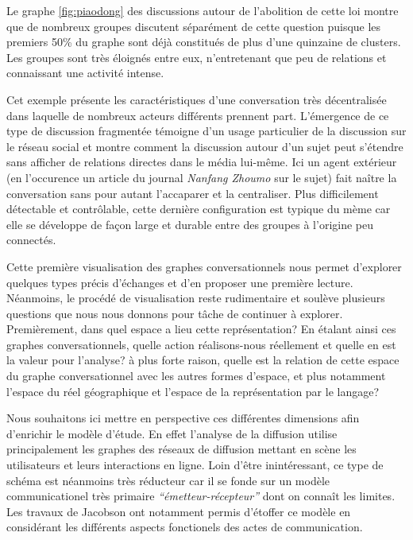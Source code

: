 Le graphe \ref{fig:piaodong} des discussions autour de l{\textquoteright}abolition de cette loi montre que de nombreux groupes discutent séparément de cette question puisque les premiers 50\% du graphe sont déjà constitués de plus d{\textquoteright}une quinzaine de clusters. Les groupes sont très éloignés entre eux, n{\textquoteright}entretenant que peu de relations et connaissant une activité intense.


Cet exemple présente les caractéristiques d{\textquoteright}une conversation très décentralisée dans laquelle de nombreux acteurs différents prennent part. L{\textquoteright}émergence de ce type de discussion fragmentée témoigne d{\textquoteright}un usage particulier de la discussion sur le réseau social et montre comment la discussion autour d{\textquoteright}un sujet peut s{\textquoteright}étendre sans afficher de relations directes dans le média lui-m\^eme. Ici un agent extérieur (en l{\textquoteright}occurence un article du journal \textit{Nanfang Zhoumo }sur le sujet) fait na\^itre la conversation sans pour autant l{\textquoteright}accaparer et la centraliser. Plus difficilement détectable et contr\^olable, cette dernière configuration est typique du mème car elle se développe de fa\c{c}on large et durable entre des groupes à l{\textquoteright}origine peu connectés.


\bigskip

Cette première visualisation des graphes conversationnels nous permet d{\textquoteright}explorer quelques types précis d{\textquoteright}échanges et d{\textquoteright}en proposer une première lecture. Néanmoins, le procédé de visualisation reste rudimentaire et soulève plusieurs questions que nous nous donnons pour t\^ache de continuer à explorer. Premièrement, dans quel espace a lieu cette représentation? En étalant ainsi ces graphes conversationnels, quelle action réalisons-nous réellement et quelle en est la valeur pour l{\textquoteright}analyse? à plus forte raison, quelle est la relation de cette espace du graphe conversationnel avec les autres formes d{\textquoteright}espace, et plus notamment l{\textquoteright}espace du réel géographique et l{\textquoteright}espace de la représentation par le langage?

Nous souhaitons ici mettre en perspective ces différentes dimensions afin d{\textquoteright}enrichir le modèle d{\textquoteright}étude. En effet l{\textquoteright}analyse de la diffusion utilise principalement les graphes des réseaux de diffusion mettant en scène les utilisateurs et leurs interactions en ligne. Loin d{\textquoteright}\^etre inintéressant, ce type de schéma est néanmoins très réducteur car il se fonde sur un modèle communicationel très primaire \textit{{\textquotedblleft}émetteur-récepteur{\textquotedblright} }dont on conna\^it les limites. Les travaux de Jacobson ont notamment permis d{\textquoteright}étoffer ce modèle en considérant les différents aspects fonctionels des actes de communication.


